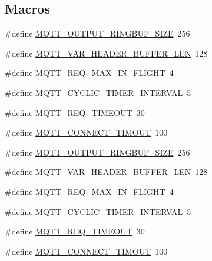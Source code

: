 \subsection*{Macros}
\begin{DoxyCompactItemize}
\item 
\#define \hyperlink{group__mqtt__opts_ga70627bafaffa071875cee9edc38d942b}{M\+Q\+T\+T\+\_\+\+O\+U\+T\+P\+U\+T\+\_\+\+R\+I\+N\+G\+B\+U\+F\+\_\+\+S\+I\+ZE}~256
\item 
\#define \hyperlink{group__mqtt__opts_ga8275ef78a85fb14c3ac1423c70e45805}{M\+Q\+T\+T\+\_\+\+V\+A\+R\+\_\+\+H\+E\+A\+D\+E\+R\+\_\+\+B\+U\+F\+F\+E\+R\+\_\+\+L\+EN}~128
\item 
\#define \hyperlink{group__mqtt__opts_gae82460b35de2291e9661e440c3458e8f}{M\+Q\+T\+T\+\_\+\+R\+E\+Q\+\_\+\+M\+A\+X\+\_\+\+I\+N\+\_\+\+F\+L\+I\+G\+HT}~4
\item 
\#define \hyperlink{group__mqtt__opts_ga1d89fda808c7047eab7a67d3785aea8e}{M\+Q\+T\+T\+\_\+\+C\+Y\+C\+L\+I\+C\+\_\+\+T\+I\+M\+E\+R\+\_\+\+I\+N\+T\+E\+R\+V\+AL}~5
\item 
\#define \hyperlink{group__mqtt__opts_ga262639f2b45f6e064fb53156396d6d0a}{M\+Q\+T\+T\+\_\+\+R\+E\+Q\+\_\+\+T\+I\+M\+E\+O\+UT}~30
\item 
\#define \hyperlink{group__mqtt__opts_gac5d0580d1caf57dac1cb56662e5d9f7b}{M\+Q\+T\+T\+\_\+\+C\+O\+N\+N\+E\+C\+T\+\_\+\+T\+I\+M\+O\+UT}~100
\item 
\#define \hyperlink{group__mqtt__opts_ga70627bafaffa071875cee9edc38d942b}{M\+Q\+T\+T\+\_\+\+O\+U\+T\+P\+U\+T\+\_\+\+R\+I\+N\+G\+B\+U\+F\+\_\+\+S\+I\+ZE}~256
\item 
\#define \hyperlink{group__mqtt__opts_ga8275ef78a85fb14c3ac1423c70e45805}{M\+Q\+T\+T\+\_\+\+V\+A\+R\+\_\+\+H\+E\+A\+D\+E\+R\+\_\+\+B\+U\+F\+F\+E\+R\+\_\+\+L\+EN}~128
\item 
\#define \hyperlink{group__mqtt__opts_gae82460b35de2291e9661e440c3458e8f}{M\+Q\+T\+T\+\_\+\+R\+E\+Q\+\_\+\+M\+A\+X\+\_\+\+I\+N\+\_\+\+F\+L\+I\+G\+HT}~4
\item 
\#define \hyperlink{group__mqtt__opts_ga1d89fda808c7047eab7a67d3785aea8e}{M\+Q\+T\+T\+\_\+\+C\+Y\+C\+L\+I\+C\+\_\+\+T\+I\+M\+E\+R\+\_\+\+I\+N\+T\+E\+R\+V\+AL}~5
\item 
\#define \hyperlink{group__mqtt__opts_ga262639f2b45f6e064fb53156396d6d0a}{M\+Q\+T\+T\+\_\+\+R\+E\+Q\+\_\+\+T\+I\+M\+E\+O\+UT}~30
\item 
\#define \hyperlink{group__mqtt__opts_gac5d0580d1caf57dac1cb56662e5d9f7b}{M\+Q\+T\+T\+\_\+\+C\+O\+N\+N\+E\+C\+T\+\_\+\+T\+I\+M\+O\+UT}~100
\end{DoxyCompactItemize}


